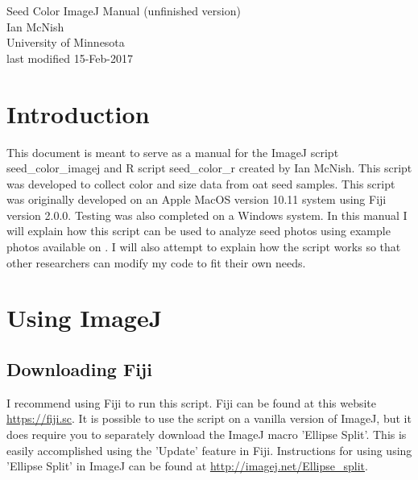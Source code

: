 \documentclass[12pt]{article}
\begin{document}

\begin{titlepage}
\vspace*{2cm}
\begin{center}
\huge{Seed Color ImageJ Manual (unfinished version)}\\
[.75cm]
\large{Ian McNish}\\
\large{University of Minnesota}\\
\large{last modified 15-Feb-2017}
\end{center}

\end{titlepage}


\tableofcontents

\thispagestyle{empty}
\cleardoublepage

\setcounter{page}{1}


\section{Introduction}\label{sec:intro}

\noindent This document is meant to serve as a manual for the ImageJ\cite{schneider2012imagej} script  seed\_color\_imagej and R\cite{r} script seed\_color\_r created by Ian McNish. This script was developed to collect color and size data from oat seed samples. This script was originally developed on an Apple MacOS version 10.11 system using Fiji  version 2.0.0. Testing was also completed on a Windows system. In this manual I will explain how this script can be used to analyze seed photos using example photos available on . I will also attempt to explain how the script works so that other researchers can modify my code to fit their own needs.

\section{Using ImageJ}\label{sec:imagej}

\subsection{Downloading Fiji}\label{sec:fiji}

\noindent I recommend using Fiji to run this script. Fiji can be found at this website \url{https://fiji.sc}. It is possible to use the script on a vanilla version of ImageJ, but it does require you to separately download the ImageJ macro 'Ellipse Split'. This is easily accomplished using the 'Update' feature in Fiji. Instructions for using using 'Ellipse Split' in ImageJ can be found at \url{http://imagej.net/Ellipse_split}.
\end{document}
